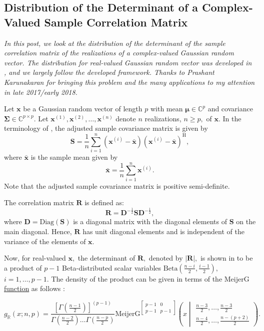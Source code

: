 \subsection{Distribution of the Determinant of a Complex-Valued Sample Correlation Matrix}

\emph{In this post, we look at the distribution of the determinant of the sample correlation matrix of the realizations of a complex-valued Gaussian random vector. The distribution for real-valued Gaussian random vector was developed in \cite{PhamGia2014}, and we largely follow the developed framework. Thanks to Prashant Karunakaran for bringing this problem and the many applications to my attention in late 2017/early 2018.}

Let $\boldsymbol{x}$ be a Gaussian random vector of length $p$ with mean $\boldsymbol{\mu} \in \mathbb{C}^p$ and covariance $\boldsymbol{\Sigma} \in \mathbb{C}^{p\times p}.$ Let $\boldsymbol{x}^{(1)}, \boldsymbol{x}^{(2)}, \dots, \boldsymbol{x}^{(n)}$ denote $n$ realizations, $n \geq p,$ of $\boldsymbol{x}.$ In the terminology of \cite{PhamGia2014}, the adjusted sample covariance matrix is given by $$\boldsymbol{S} = \frac{1}{n}\sum_{i = 1}^{n}(\boldsymbol{x}^{(i)} - \bar{\boldsymbol{x}})(\boldsymbol{x}^{(i)} - \bar{\boldsymbol{x}})^\mathrm{H},$$ where $\bar{\boldsymbol{x}}$ is the sample mean given by $$\bar{\boldsymbol{x}} = \frac{1}{n}\sum_{i = 1}^{n}\boldsymbol{x}^{(i)}.$$ Note that the adjusted sample covariance matrix is positive semi-definite.

The correlation matrix $\boldsymbol{R}$ is defined as: $$\boldsymbol{R} = \boldsymbol{D}^{-\frac{1}{2}} \boldsymbol{S} \boldsymbol{D}^{-\frac{1}{2}},$$ where $\boldsymbol{D} = \mathrm{Diag}(\boldsymbol{S})$ is a diagonal matrix with the diagonal elements of $\boldsymbol{S}$ on the main diagonal. Hence, $\boldsymbol{R}$ has unit diagonal elements and is independent of the variance of the elements of $\boldsymbol{x}.$ 

Now, for real-valued $\boldsymbol{x},$ the determinant of $\boldsymbol{R},$ denoted by $|\boldsymbol{R}|,$ is shown in \cite[Theorem 2]{PhamGia2014} to be a product of $p-1$ Beta-distributed scalar variables $\mathrm{Beta}(\frac{n-i}{2},\frac{i-1}{2}),$  $i=1,\dots,p-1.$ The density of the product can be given in terms of the \href{https://mathworld.wolfram.com/MeijerG-Function.html}{$\mathrm{MeijerG}$ function} as follows \cite[Theorem 2]{PhamGia2014}:

$$g_\mathbb{R}(x;n,p) = \frac{\left[\Gamma(\frac{n-1}{2})\right]^{(p-1)} }{\Gamma(\frac{n-2}{2})\dots\Gamma(\frac{n-p}{2})} \mathrm{MeijerG}^{\begin{bmatrix}p-1 & 0 \\ p-1 & p-1\end{bmatrix}}\left(x\middle|\begin{matrix}\frac{n-3}{2},\dots,\frac{n-3}{2}\\ \frac{n-4}{2},\dots,\frac{n-(p+2)}{2}\end{matrix}\right).$$

